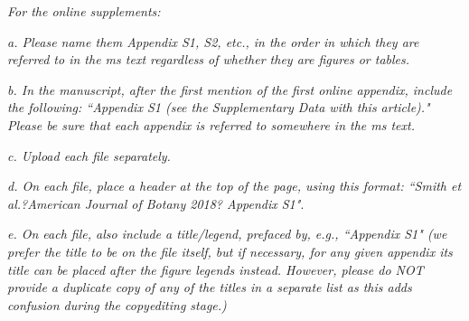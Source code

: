 \documentclass[10.95pt,a4paper]{letter}
\begin{document}
\par \emph{For the online supplements:}
\par \emph{a. Please name them Appendix S1, S2, etc., in the order in which they are referred to in the ms text regardless of whether they are figures or tables. } 
\par \emph{b. In the manuscript, after the first mention of the first online appendix, include the following: ``Appendix S1 (see the Supplementary Data with this article)." Please be sure that each appendix is referred to somewhere in the ms text.}
\par \emph{c. Upload each file separately.}  
\par \emph{d. On each file, place a header at the top of the page, using this format: ``Smith et al.?American Journal of Botany 2018? Appendix S1"}.
\par \emph{e. On each file, also include a title/legend, prefaced by, e.g., ``Appendix S1" (we prefer the title to be on the file itself, but if necessary, for any given appendix its title can be placed after the figure legends instead. However, please do NOT provide a duplicate copy of any of the titles in a separate list as this adds confusion during the copyediting stage.)}
\end{document}

